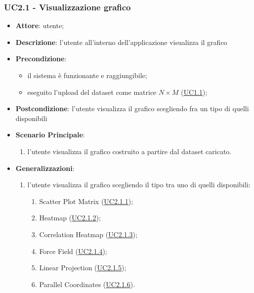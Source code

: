     \subsubsection{UC2.1 - Visualizzazione grafico}
    \label{uc2.1}
    \begin{itemize}
    \item \textbf{Attore}: utente;
    \item \textbf{Descrizione}: l'utente all'interno dell'applicazione visualizza il grafico
    \item \textbf{Precondizione}:
    \begin{itemize}
        \item il sistema è funzionante e raggiungibile;
        \item eseguito l'upload del dataset come matrice $N\times M$ (\hyperref[uc1.1]{UC1.1});
    \end{itemize}
    \item \textbf{Postcondizione}: l'utente visualizza il grafico scegliendo fra un tipo di quelli disponibili
    \item \textbf{Scenario Principale}: 
        \begin{enumerate}
            \item l'utente visualizza il grafico costruito a partire dal dataset caricato.
        \end{enumerate}  
    \item \textbf{Generalizzazioni}:
        \begin{enumerate}
            \item l'utente visualizza il grafico scegliendo il tipo tra uno di quelli disponibili:
                \begin{enumerate}
                    \item Scatter Plot Matrix (\hyperref[uc2.1.1]{UC2.1.1});
                    \item Heatmap (\hyperref[uc2.1.2]{UC2.1.2});
                    \item Correlation Heatmap (\hyperref[uc2.1.3]{UC2.1.3});
                    \item Force Field (\hyperref[uc2.1.4]{UC2.1.4});
                    \item Linear Projection (\hyperref[uc2.1.5]{UC2.1.5});
                    \item Parallel Coordinates (\hyperref[uc2.1.6]{UC2.1.6}).
                \end{enumerate}
        \end{enumerate}  
    \end{itemize}
    
